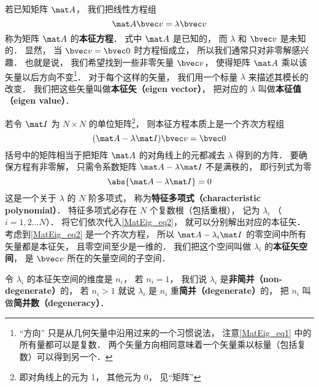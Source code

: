 

若已知矩阵 $\mat A$， 我们把线性方程组
\begin{equation}\label{MatEig_eq1}
\mat A \bvec v = \lambda \bvec v
\end{equation}
称为矩阵 $\mat A$ 的\textbf{本征方程}． 式中 $\mat A$ 是已知的， 而 $\lambda$ 和 $\bvec v$ 是未知的． 显然， 当 $\bvec v = \bvec 0$ 时方程恒成立， 所以我们通常只对非零解感兴趣． 也就是说， 我们希望找到一些非零矢量 $\bvec v$， 使得矩阵 $\mat A$ 乘以该矢量以后方向不变\footnote{“方向” 只是从几何矢量中沿用过来的一个习惯说法， 注意\autoref{MatEig_eq1} 中的所有量都可以是复数． 两个矢量方向相同意味着一个矢量乘以标量（包括复数）可以得到另一个．}． 对于每个这样的矢量， 我们用一个标量 $\lambda$ 来描述其模长的改变． 我们把这些矢量叫做\textbf{本征矢（eigen vector）}， 把对应的 $\lambda$ 叫做\textbf{本征值（eigen value）}．

若令 $\mat I$ 为 $N\times N$ 的单位矩阵\footnote{即对角线上的元为 1， 其他元为 0， 见“矩阵”}， 则本征方程本质上是一个齐次方程组
\begin{equation}\label{MatEig_eq2}
(\mat A - \lambda\mat I)\bvec v = \bvec 0
\end{equation}
括号中的矩阵相当于把矩阵 $\mat A$ 的对角线上的元都减去 $\lambda$ 得到的方阵． 要确保方程有非零解， 只需令系数矩阵 $\mat A - \lambda\mat I$ 不是满秩的， 即行列式为零
\begin{equation}
\abs{\mat A - \lambda\mat I} = 0
\end{equation}
这是一个关于 $\lambda$ 的 $N$ 阶多项式， 称为\textbf{特征多项式（characteristic polynomial）}． 特征多项式必存在 $N$ 个复数根（包括重根），%
记为 $\lambda_i$ （$i = 1, 2\dots N$）． 将它们依次代入\autoref{MatEig_eq2}， 就可以分别解出对应的本征矢． 考虑到\autoref{MatEig_eq2} 是一个齐次方程， 所以 $\mat A - \lambda_i\mat I$ 的零空间中所有矢量都是本征矢， 且零空间至少是一维的． 我们把这个空间叫做 $\lambda_i$ 的\textbf{本征矢空间}， 是 $\bvec v$ 所在的矢量空间的子空间．

令 $\lambda_i$ 的本征矢空间的维度是 $n_i$， 若 $n_i = 1$， 我们说 $\lambda_i$ 是\textbf{非简并（non-degenerate）}的， 若 $n_i > 1$ 就说 $\lambda_i$ 是 $n_i$ 重\textbf{简并（degenerate）}的， 把 $n_i$ 叫做\textbf{简并数（degeneracy）}．


